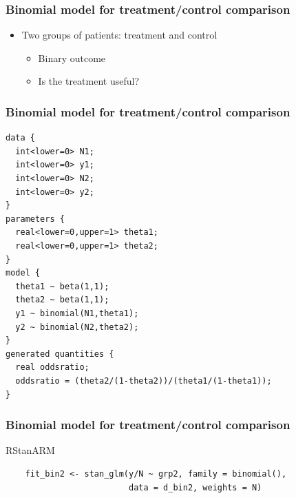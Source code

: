 \documentclass[english,t]{beamer}
\begin{document}


\begin{frame}[fragile]
  \frametitle{Binomial model for treatment/control comparison}

  \begin{itemize}
  \item Two groups of patients: treatment and control
    \begin{itemize}
    \item Binary outcome
    \item Is the treatment useful?
    \end{itemize}
  \end{itemize}

\end{frame}
  
\begin{frame}[fragile]
  \frametitle{Binomial model for treatment/control comparison}
  {\footnotesize
  \begin{lstlisting}
data {
  int<lower=0> N1;
  int<lower=0> y1;
  int<lower=0> N2;
  int<lower=0> y2;
}
parameters {
  real<lower=0,upper=1> theta1;
  real<lower=0,upper=1> theta2;
}
model {
  theta1 ~ beta(1,1);
  theta2 ~ beta(1,1);
  y1 ~ binomial(N1,theta1);
  y2 ~ binomial(N2,theta2);
}
generated quantities {
  real oddsratio;
  oddsratio = (theta2/(1-theta2))/(theta1/(1-theta1));
}
  \end{lstlisting}
}
\end{frame} 

\begin{frame}[fragile]
  \frametitle{Binomial model for treatment/control comparison}

  RStanARM
  {\scriptsize
  \begin{lstlisting}
    fit_bin2 <- stan_glm(y/N ~ grp2, family = binomial(),
                         data = d_bin2, weights = N)
  \end{lstlisting}
}
\end{frame} 
\end{document}
